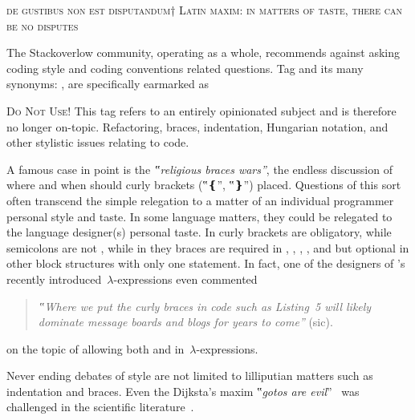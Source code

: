 \begin{flushright}
  \scriptsize
\textsc{de gustibus non est disputandum†{%
    Latin maxim: in matters of taste, there can be no disputes
}}
\end{flushright}
\vspace{-1ex}

The Stackoverlow community, operating as a whole,
recommends against asking coding style and coding conventions related
questions. Tag  and its many synonyms: ,
 are specifically
earmarked as

{\scriptsize
\begin{tcolorbox}[colback=green!5!white,colframe=blue!25!white,notitle]
  \textsc{Do Not Use!}
This tag refers to an entirely opinionated subject and is therefore
no longer on-topic. Refactoring, braces, indentation, Hungarian notation, and
other stylistic issues relating to code.
\end{tcolorbox}}

A famous case in point is the \emph{‟religious braces wars”}, the endless
discussion of where and when should curly brackets (‟\cc❴”, ‟\cc❵”) placed.
Questions of this sort often transcend the simple relegation to a matter of an
individual programmer personal style and taste. In some language matters, they
could be relegated to the language designer(s) personal taste. In \Go curly
brackets are obligatory, while semicolons are not%
, while in \Java they braces are
required in , , , , and
 but optional in other block structures with only one statement.
In fact, one of the designers of \Java's recently introduced~$λ$-expressions
even commented
\begin{quote}
  \footnotesize
\emph{‟Where we put the curly braces in code such as Listing~5 will likely
dominate \Java message boards and blogs for years to come”} (sic).
\end{quote}
on the topic of allowing both \mbox{} and \mbox{} in~$λ$-expressions.

Never ending debates of style are not limited to lilliputian matters such as
indentation and braces. Even the Dijksta's maxim ‟\emph{gotos are
evil}”~\cite{Dijkstra:68} was challenged in the scientific
literature~\cite{Knuth:74,Ramshaw:88,Bochmann:73,Sennesh:Gil:16,Zoethout:79,Wulf:79,Clark:84}.

